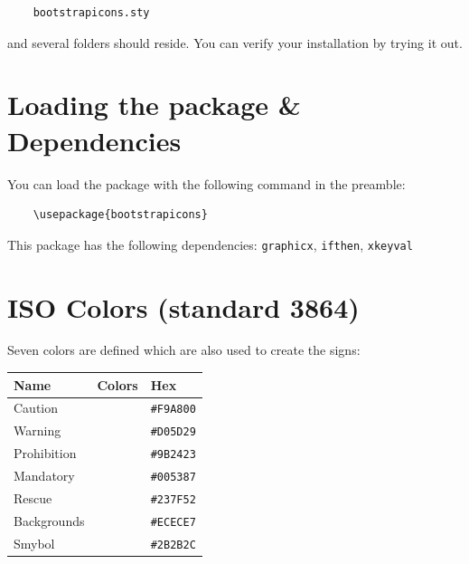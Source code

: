 \documentclass{article}
\begin{document}
\begin{verbatim}
    bootstrapicons.sty
\end{verbatim} 
and several folders should reside. You can verify your installation by trying it out.

\section{Loading the package \& Dependencies}

You can load the package with the following command in the preamble:

\vspace{5mm}
\begin{tcolorbox}[colback=gray-200]
    \vspace{3mm}
    \begin{verbatim}
    \usepackage{bootstrapicons}
    \end{verbatim}    
\end{tcolorbox}\vspace{5mm}

\noindent This package has the following dependencies: \texttt{graphicx}, \texttt{ifthen}, \texttt{xkeyval}

\section{ISO Colors (standard 3864)}

Seven colors are defined which are also used to create the signs: \vspace{5mm}

\renewcommand{\arraystretch}{1.2}
    \begin{tabular}{|l|l|l|}
        \hline
        \textbf{Name} & \textbf{Colors} & \textbf{Hex} \\ 
        \hline
        Caution & \cellcolor{Caution} & \texttt{\#F9A800} \\
        Warning & \cellcolor{Warning} & \texttt{\#D05D29} \\
        Prohibition & \cellcolor{Prohibition} & \texttt{\#9B2423} \\
        Mandatory & \cellcolor{Mandatory} & \texttt{\#005387} \\
        Rescue & \cellcolor{Rescue} & \texttt{\#237F52} \\
        Backgrounds & \cellcolor{Backgrounds} & \texttt{\#ECECE7} \\
        Smybol & \cellcolor{Symbol} & \texttt{\#2B2B2C} \\
        \hline
\end{tabular}\vspace{5mm}
\end{document}
